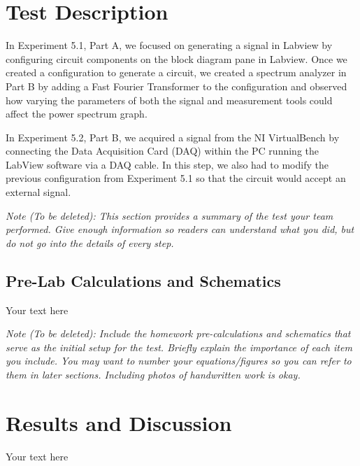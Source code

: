 \documentclass[10pt]{article}
\begin{document}
\medskip


\section{Test Description}

In Experiment 5.1, Part A, we focused on generating a signal in Labview by configuring circuit components on the block diagram pane in Labview. Once we created a configuration to generate a circuit, we created a spectrum analyzer in Part B by adding a Fast Fourier Transformer to the configuration and observed how varying the parameters of both the signal and measurement tools could affect the power spectrum graph. 

In Experiment 5.2, Part B, we acquired a signal from the NI VirtualBench by connecting the Data Acquisition Card (DAQ) within the PC running the LabView software via a DAQ cable. In this step, we also had to modify the previous configuration from Experiment 5.1 so that the circuit would accept an external signal. 

\medskip

\textit{Note (To be deleted): This section provides a summary of the test your team performed. Give enough information so readers can understand what you did, but do not go into the details of every step.}

\subsection{Pre-Lab Calculations and Schematics}

Your text here

\medskip

\textit{Note (To be deleted): Include the homework pre-calculations and schematics that serve as the initial setup for the test. Briefly explain the importance of each item you include. You may want to number your equations/figures so you can refer to them in later sections. Including photos of handwritten work is okay.}

\section{Results and Discussion}

Your text here
\end{document}
